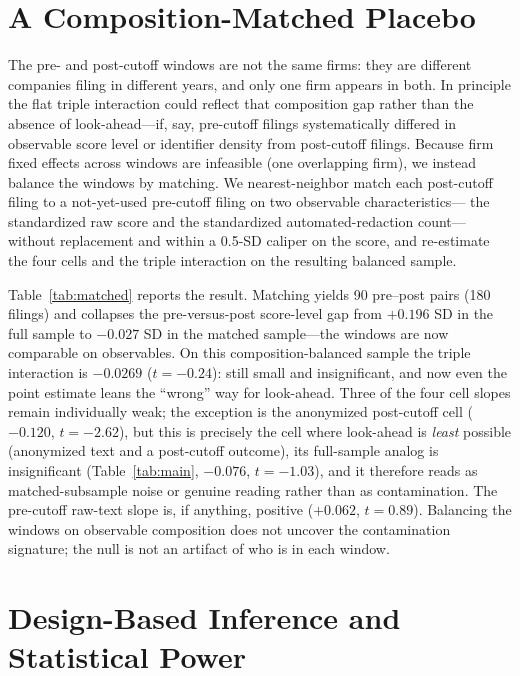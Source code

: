 \documentclass[12pt]{article}
\begin{document}
\section{A Composition-Matched Placebo}\label{sec:matched}
The pre- and post-cutoff windows are not the same firms: they are different companies filing
in different years, and only one firm appears in both. In principle the flat triple
interaction could reflect that composition gap rather than the absence of look-ahead---if,
say, pre-cutoff filings systematically differed in observable score level or identifier
density from post-cutoff filings. Because firm fixed effects across windows are infeasible
(one overlapping firm), we instead balance the windows by matching. We nearest-neighbor match
each post-cutoff filing to a not-yet-used pre-cutoff filing on two observable characteristics---
the standardized raw score and the standardized automated-redaction count---without
replacement and within a 0.5-SD caliper on the score, and re-estimate the four cells and the
triple interaction on the resulting balanced sample.

Table~\ref{tab:matched} reports the result. Matching yields 90 pre--post pairs (180 filings)
and collapses the pre-versus-post score-level gap from $+0.196$ SD in the full sample to
$-0.027$ SD in the matched sample---the windows are now comparable on observables. On this
composition-balanced sample the triple interaction is $-0.0269$ ($t=-0.24$): still small and
insignificant, and now even the point estimate leans the ``wrong'' way for look-ahead. Three
of the four cell slopes remain individually weak; the exception is the anonymized post-cutoff
cell ($-0.120$, $t=-2.62$), but this is precisely the cell where look-ahead is \emph{least}
possible (anonymized text and a post-cutoff outcome), its full-sample analog is insignificant
(Table~\ref{tab:main}, $-0.076$, $t=-1.03$), and it therefore reads as matched-subsample noise
or genuine reading rather than as contamination. The pre-cutoff raw-text slope is, if
anything, positive ($+0.062$, $t=0.89$). Balancing the windows on observable composition does
not uncover the contamination signature; the null is not an artifact of who is in each window.

\section{Design-Based Inference and Statistical Power}\label{sec:inference}
\end{document}
